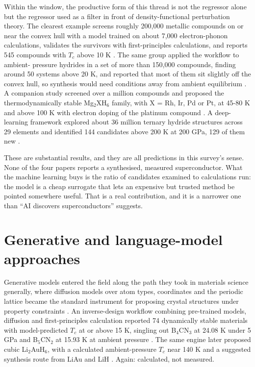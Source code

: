 \documentclass[
  11pt,
]{article}
\begin{document}
Within the window, the productive form of this thread is not the
regressor alone but the regressor used as a filter in front of
density-functional perturbation theory. The clearest example screens
roughly 200,000 metallic compounds on or near the convex hull with a
model trained on about 7,000 electron-phonon calculations, validates the
survivors with first-principles calculations, and reports 545 compounds
with \(T_c\) above 10 K \citep{cerqueira2023sampling}. The same group
applied the workflow to ambient- pressure hydrides in a set of more than
150,000 compounds, finding around 50 systems above 20 K, and reported
that most of them sit slightly off the convex hull, so synthesis would
need conditions away from ambient equilibrium
\citep{cerqueira2024searching}. A companion study screened over a
million compounds and proposed the thermodynamically stable
Mg\(_2\)XH\(_6\) family, with X = Rh, Ir, Pd or Pt, at 45-80 K and above
100 K with electron doping of the platinum compound
\citep{sanna2023prediction}. A deep-learning framework explored about 36
million ternary hydride structures across 29 elements and identified 144
candidates above 200 K at 200 GPa, 129 of them new
\citep{wang2025discoverya}.

These are substantial results, and they are all predictions in this
survey's sense. None of the four papers reports a synthesised, measured
superconductor. What the machine learning buys is the ratio of
candidates examined to calculations run: the model is a cheap surrogate
that lets an expensive but trusted method be pointed somewhere useful.
That is a real contribution, and it is a narrower one than ``AI
discovers superconductors'' suggests.

\section{Generative and language-model
approaches}\label{generative-and-language-model-approaches}

Generative models entered the field along the path they took in
materials science generally, where diffusion models over atom types,
coordinates and the periodic lattice became the standard instrument for
proposing crystal structures under property constraints
\citep{zeni2025mattergen}. An inverse-design workflow combining
pre-trained models, diffusion and first-principles calculation reported
74 dynamically stable materials with model-predicted \(T_c\) at or above
15 K, singling out B\(_4\)CN\(_3\) at 24.08 K under 5 GPa and
B\(_5\)CN\(_2\) at 15.93 K at ambient pressure
\citep{han2024invdesflow}. The same engine later proposed cubic
Li\(_2\)AuH\(_6\), with a calculated ambient-pressure \(T_c\) near 140 K
and a suggested synthesis route from LiAu and LiH
\citep{ouyang2025high}. Again: calculated, not measured.
\end{document}
